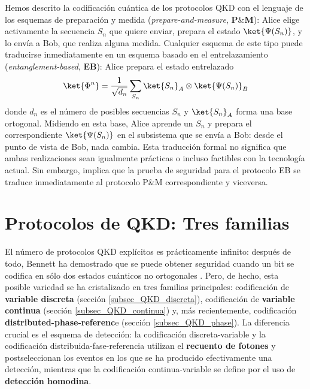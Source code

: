 \documentclass[a4paper,11pt]{book} %
\numberwithin{equation}{chapter}
\begin{document}
Hemos descrito la codificación cuántica de los protocolos QKD con el lenguaje de los esquemas de preparación y medida (\textit{prepare-and-measure}, \textbf{P$\&$M}): Alice elige activamente la secuencia $S_n$ que quiere enviar, prepara el estado $\ket{\Psi(S_n)}$, y lo envía a Bob, que realiza alguna medida. Cualquier esquema de este tipo puede traducirse inmediatamente en un esquema basado en el entrelazamiento (\textit{entanglement-based}, \textbf{EB}): Alice prepara el estado entrelazado
	\begin{equation}
	\ket{\Phi^n} = \frac{1}{\sqrt{d_n}} \sum_{S_n} \ket{S_n}_A \otimes \ket{\Psi(S_n)}_B
	\end{equation}
donde $d_n$ es el número de posibles secuencias $S_n$ y $\ket{S_n}_A$ forma una base ortogonal. Midiendo en esta base, Alice aprende un $S_n$ y prepara el correspondiente $\ket{\Psi(S_n)}$ en el subsistema que se envía a Bob: desde el punto de vista de Bob, nada cambia. Esta traducción formal no significa que ambas realizaciones sean igualmente prácticas o incluso factibles con la tecnología actual. Sin embargo, implica que la prueba de seguridad para el protocolo EB se traduce inmediatamente al protocolo P$\&$M correspondiente y viceversa.
		
	\section{Protocolos de QKD: Tres familias}
	
El número de protocolos QKD explícitos es prácticamente infinito: después de todo, Bennett ha demostrado que se puede obtener seguridad cuando un bit se codifica en sólo dos estados cuánticos no ortogonales \cite{BB84_E91_iguales}. Pero, de hecho, esta posible variedad se ha cristalizado en tres familias principales: codificación de \textbf{variable discreta} (sección \ref{subsec_QKD_discreta}), codificación de \textbf{variable continua} (sección \ref{subsec_QKD_continua}) y, más recientemente, codificación \textbf{distributed-phase-referenc}e (sección \ref{subsec_QKD_phase}). La diferencia crucial es el esquema de detección: la codificación discreta-variable y la codificación distribuida-fase-referencia utilizan el \textbf{recuento de fotones} y postseleccionan los eventos en los que se ha producido efectivamente una detección, mientras que la codificación continua-variable se define por el uso de \textbf{detección homodina}.
\end{document}
